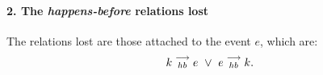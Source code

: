 \paragraph{2. The \emph{happens-before} relations lost}

    The relations lost are those attached to the event $e$, which are: 
    \begin{align}
        k\stackrel{\longrightarrow}{_{hb}}e \ \vee \ e\stackrel{\longrightarrow}{_{hb}}k.
    \end{align}

